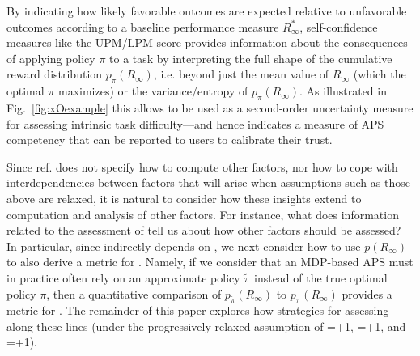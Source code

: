 By indicating how likely favorable outcomes are expected relative to unfavorable outcomes according to a baseline performance measure $R^*_{\infty}$, self-confidence measures like the UPM/LPM score provides information about the consequences of applying policy $\pi$ to a task by interpreting the full shape of the cumulative reward distribution $p_{\pi}(R_{\infty})$, i.e. beyond just the mean value of $R_{\infty}$ (which the optimal $\pi$ maximizes) or the variance/entropy of $p_{\pi}(R_{\infty})$. As illustrated in Fig.~\ref{fig:xOexample} this allows \xO{} to be used as a second-order uncertainty measure for assessing intrinsic task difficulty---and hence indicates a measure of APS competency that can be reported to users to calibrate their trust. %

 Since ref. \cite{Aitken2016-cv} does not specify how to compute other factors, nor how to cope with interdependencies between factors that will arise when assumptions such as those above are relaxed, it is natural to consider how these insights extend to computation and analysis of other \famsec{} factors. For instance, what does information related to the assessment of \xO{} tell us about how other factors should be assessed? In particular, since \xO indirectly depends on \xQ, we next consider how to use $p(R_{\infty})$ to also derive a metric for \xQ. Namely, if we consider that an MDP-based APS must in practice often rely on an approximate policy $\tilde{\pi}$ instead of the true optimal policy $\pi$, then a quantitative comparison of $p_{\tilde{\pi}}(R_{\infty})$ to $p_{\pi}(R_{\infty})$ provides a metric for \xQ. The remainder of this paper explores how strategies for assessing \xQ along these lines (under the progressively relaxed assumption of \xM{}=+1, \xP{}=+1, and \xI{}=+1). 

